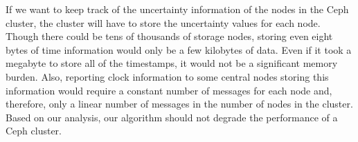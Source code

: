 If we want to keep track of the uncertainty information of the nodes
in the Ceph cluster, the cluster will have to store the uncertainty
values for each node. Though there could be tens of thousands of
storage nodes, storing even eight bytes of time information would only
be a few kilobytes of data. Even if it took a megabyte to store all of
the timestamps, it would not be a significant memory burden. Also,
reporting clock information to some central nodes storing this
information would require a constant number of messages for each node
and, therefore, only a linear number of messages in the number of
nodes in the cluster.  Based on our analysis, our algorithm should not
degrade the performance of a Ceph cluster.
